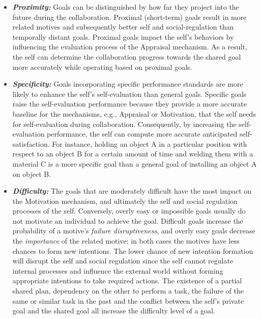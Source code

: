 \documentclass[12pt]{report}
\begin{document}
\begin{itemize}
  \item \textbf{\textit{Proximity:}} Goals can be distinguished by how far they
  project into the future during the collaboration. Proximal (short-term) goals
  result in more related motives and subsequently better self and
  social-regulation than temporally distant goals. Proximal goals impact the
  self's behaviors by influencing the evaluation process of the Appraisal
  mechanism. As a result, the self can determine the collaboration progress
  towards the shared goal more accurately while operating based on proximal
  goals.
  
  \item \textbf{\textit{Specificity:}} Goals incorporating specific performance
  standards are more likely to enhance the self's self-evaluation than general
  goals. Specific goals raise the self-evaluation performance because they
  provide a more accurate baseline for the mechanisms, e.g., Appraisal or
  Motivation, that the self needs for self-evaluation during collaboration.
  Consequently, by increasing the self-evaluation performance, the self can
  compute more accurate anticipated self-satisfaction. For instance, holding an
  object A in a particular position with respect to an object B for a certain
  amount of time and welding them with a material C is a more specific goal than
  a general goal of installing an object A on object B.
  
  \item \textbf{\textit{Difficulty:}} The goals that are moderately difficult
  have the most impact on the Motivation mechanism, and ultimately the self and
  social regulation processes of the self. Conversely, overly easy or impossible
  goals usually do not motivate an individual to achieve the goal. Difficult
  goals increase the probability of a motive's \textit{failure disruptiveness},
  and overly easy goals decrease the \textit{importance} of the related motive;
  in both cases the motives have less chances to form new intentions. The lower
  chance of new intention formation will disrupt the self and social regulation
  since the self cannot regulate internal processes and influence the external
  world without forming appropriate intentions to take required actions. The
  existence of a partial shared plan, dependency on the other to perform a task,
  the failure of the same or similar task in the past and the conflict between
  the self's private goal and the shared goal all increase the difficulty level
  of a goal.
\end{itemize}
\end{document}

